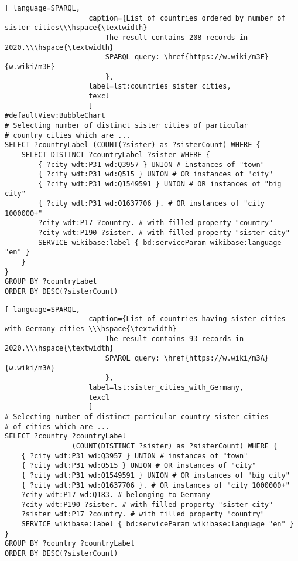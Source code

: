 \begin{lstlisting}[ language=SPARQL, 
                    caption={List of countries ordered by number of sister cities\\\hspace{\textwidth}
                        The result contains 208 records in 2020.\\\hspace{\textwidth}
                        SPARQL query: \href{https://w.wiki/m3E}{w.wiki/m3E}
                        },
                    label=lst:countries_sister_cities,
                    texcl 
                    ]
#defaultView:BubbleChart
# Selecting number of distinct sister cities of particular  
# country cities which are ... 
SELECT ?countryLabel (COUNT(?sister) as ?sisterCount) WHERE { 
	SELECT DISTINCT ?countryLabel ?sister WHERE {
		{ ?city wdt:P31 wd:Q3957 } UNION # instances of "town"
		{ ?city wdt:P31 wd:Q515 } UNION # OR instances of "city"
		{ ?city wdt:P31 wd:Q1549591 } UNION # OR instances of "big city"
		{ ?city wdt:P31 wd:Q1637706 }. # OR instances of "city 1000000+"
		?city wdt:P17 ?country. # with filled property "country"
		?city wdt:P190 ?sister. # with filled property "sister city"
		SERVICE wikibase:label { bd:serviceParam wikibase:language "en" }
	}                                 
}
GROUP BY ?countryLabel
ORDER BY DESC(?sisterCount)
\end{lstlisting}%

\begin{lstlisting}[ language=SPARQL, 
                    caption={List of countries having sister cities with Germany cities \\\hspace{\textwidth}
                        The result contains 93 records in 2020.\\\hspace{\textwidth}
                        SPARQL query: \href{https://w.wiki/m3A}{w.wiki/m3A}
                        },
                    label=lst:sister_cities_with_Germany,
                    texcl 
                    ]
# Selecting number of distinct particular country sister cities  
# of cities which are ...
SELECT ?country ?countryLabel 
				(COUNT(DISTINCT ?sister) as ?sisterCount) WHERE {                                                          
	{ ?city wdt:P31 wd:Q3957 } UNION # instances of "town"
	{ ?city wdt:P31 wd:Q515 } UNION # OR instances of "city"
	{ ?city wdt:P31 wd:Q1549591 } UNION # OR instances of "big city"      
	{ ?city wdt:P31 wd:Q1637706 }. # OR instances of "city 1000000+"
	?city wdt:P17 wd:Q183. # belonging to Germany  
	?city wdt:P190 ?sister. # with filled property "sister city"
	?sister wdt:P17 ?country. # with filled property "country"
	SERVICE wikibase:label { bd:serviceParam wikibase:language "en" }
}
GROUP BY ?country ?countryLabel
ORDER BY DESC(?sisterCount)
\end{lstlisting}%

